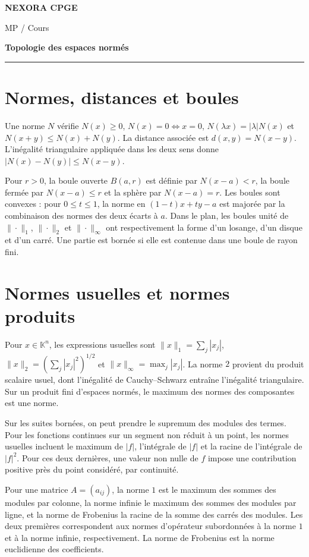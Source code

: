 \documentclass[11pt,a4paper]{article}
\begin{document}
{\small\bfseries\color{nexorablue} NEXORA CPGE}\par
{\small MP / Cours}\par
{\LARGE\bfseries Topologie des espaces normés}\par
\vspace{0.25em}\hrule\vspace{0.6em}

\section*{Normes, distances et boules}
Une norme $N$ vérifie $N(x)\ge0$, $N(x)=0\Leftrightarrow x=0$, $N(\lambda x)=|\lambda|N(x)$ et $N(x+y)\le N(x)+N(y)$. La distance associée est $d(x,y)=N(x-y)$. L’inégalité triangulaire appliquée dans les deux sens donne $|N(x)-N(y)|\le N(x-y)$.

Pour $r>0$, la boule ouverte $B(a,r)$ est définie par $N(x-a)<r$, la boule fermée par $N(x-a)\le r$ et la sphère par $N(x-a)=r$. Les boules sont convexes : pour $0\le t\le1$, la norme en $(1-t)x+ty-a$ est majorée par la combinaison des normes des deux écarts à $a$. Dans le plan, les boules unité de $\|\cdot\|_1$, $\|\cdot\|_2$ et $\|\cdot\|_\infty$ ont respectivement la forme d’un losange, d’un disque et d’un carré. Une partie est bornée si elle est contenue dans une boule de rayon fini.

\section*{Normes usuelles et normes produits}
Pour $x\in\mathbb K^n$, les expressions usuelles sont $\|x\|_1=\sum_j|x_j|$, $\|x\|_2=(\sum_j|x_j|^2)^{1/2}$ et $\|x\|_\infty=\max_j|x_j|$. La norme $2$ provient du produit scalaire usuel, dont l’inégalité de Cauchy–Schwarz entraîne l’inégalité triangulaire. Sur un produit fini d’espaces normés, le maximum des normes des composantes est une norme.

Sur les suites bornées, on peut prendre le supremum des modules des termes. Pour les fonctions continues sur un segment non réduit à un point, les normes usuelles incluent le maximum de $|f|$, l’intégrale de $|f|$ et la racine de l’intégrale de $|f|^2$. Pour ces deux dernières, une valeur non nulle de $f$ impose une contribution positive près du point considéré, par continuité.

Pour une matrice $A=(a_{ij})$, la norme $1$ est le maximum des sommes des modules par colonne, la norme infinie le maximum des sommes des modules par ligne, et la norme de Frobenius la racine de la somme des carrés des modules. Les deux premières correspondent aux normes d’opérateur subordonnées à la norme $1$ et à la norme infinie, respectivement. La norme de Frobenius est la norme euclidienne des coefficients.
\end{document}
